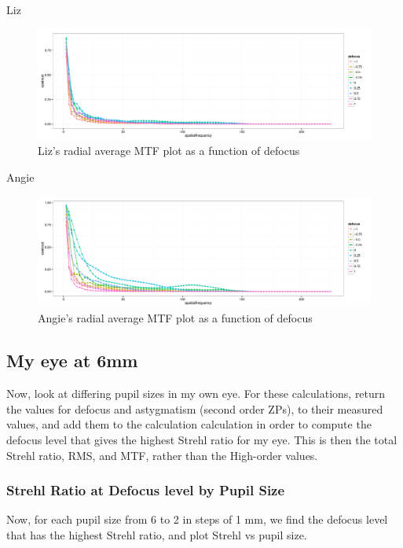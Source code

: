 \documentclass{article}
\begin{document}
Liz
\begin{figure}[H]
  \centering
    \includegraphics[width=1\linewidth]{liz_dmtfs.pdf}
  \caption{Liz's radial average MTF plot as a function of defocus}
  \label{fig:lmtfs}
\end{figure}

Angie
\begin{figure}[H]
  \centering
    \includegraphics[width=1\linewidth]{angie_dmtfs.pdf}
  \caption{Angie's radial average MTF plot as a function of defocus}
  \label{fig:amtfs}
\end{figure}

\subsection{My eye at 6mm}

Now, look at differing pupil sizes in my own eye. For these calculations, return the values for defocus and astygmatism (second order ZPs), to their measured values, and add them to the calculation calculation in order to compute the defocus level that gives the highest Strehl ratio for my eye. This is then the total Strehl ratio, RMS, and MTF, rather than the High-order values.

\subsubsection{Strehl Ratio at Defocus level by Pupil Size}
Now, for each pupil size from 6 to 2 in steps of 1 mm, we find the defocus level that has the highest Strehl ratio, and plot Strehl vs pupil size.
\end{document}
